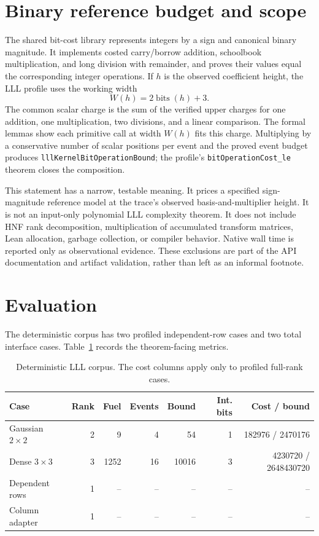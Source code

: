 \documentclass[11pt]{article}
\newcommand{\code}[1]{\texttt{#1}}
\newcommand{\bits}{\operatorname{bits}}
\begin{document}
\section{Binary reference budget and scope}

The shared bit-cost library represents integers by a sign and canonical binary
magnitude.  It implements costed carry/borrow addition, schoolbook
multiplication, and long division with remainder, and proves their values equal
the corresponding integer operations.  If $h$ is the observed coefficient
height, the LLL profile uses the working width
\[
  W(h)=2\bits(h)+3.
\]
The common scalar charge is the sum of the verified upper charges for one
addition, one multiplication, two divisions, and a linear comparison.  The
formal lemmas show each primitive call at width $W(h)$ fits this charge.
Multiplying by a conservative number of scalar positions per event and the
proved event budget produces \code{lllKernelBitOperationBound}; the profile's
\code{bitOperationCost\_le} theorem closes the composition.

This statement has a narrow, testable meaning.  It prices a specified
sign-magnitude reference model at the trace's observed basis-and-multiplier
height.  It is not an input-only polynomial LLL complexity theorem.  It does
not include HNF rank decomposition, multiplication of accumulated transform
matrices, Lean allocation, garbage collection, or compiler behavior.  Native
wall time is reported only as observational evidence.  These exclusions are
part of the API documentation and artifact validation, rather than left as an
informal footnote.

\section{Evaluation}

The deterministic corpus has two profiled independent-row cases and two total
interface cases.  Table~\ref{tab:cases} records the theorem-facing metrics.

\begin{table}[ht]
\centering
\caption{Deterministic LLL corpus. The cost columns apply only to profiled
full-rank cases.}
\label{tab:cases}
\begin{tabular}{lrrrrrr}
\toprule
Case & Rank & Fuel & Events & Bound & Int. bits & Cost / bound \\
\midrule
Gaussian $2\times2$ & 2 & 9 & 4 & 54 & 1 & 182976 / 2470176 \\
Dense $3\times3$ & 3 & 1252 & 16 & 10016 & 3 & 4230720 / 2648430720 \\
Dependent rows & 1 & -- & -- & -- & -- & -- \\
Column adapter & 1 & -- & -- & -- & -- & -- \\
\bottomrule
\end{tabular}
\end{table}
\end{document}
